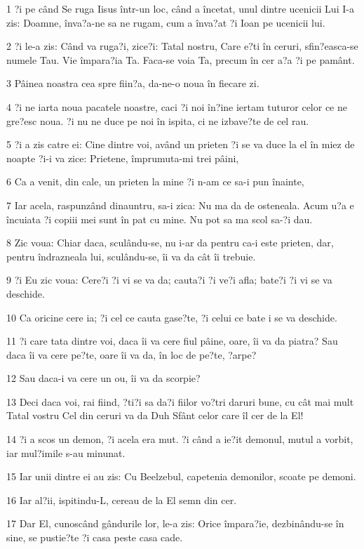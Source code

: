 \par 1 ?i pe când Se ruga Iisus într-un loc, când a încetat, unul dintre ucenicii Lui I-a zis: Doamne, înva?a-ne sa ne rugam, cum a înva?at ?i Ioan pe ucenicii lui.
\par 2 ?i le-a zis: Când va ruga?i, zice?i: Tatal nostru, Care e?ti în ceruri, sfin?easca-se numele Tau. Vie împara?ia Ta. Faca-se voia Ta, precum în cer a?a ?i pe pamânt.
\par 3 Pâinea noastra cea spre fiin?a, da-ne-o noua în fiecare zi.
\par 4 ?i ne iarta noua pacatele noastre, caci ?i noi în?ine iertam tuturor celor ce ne gre?esc noua. ?i nu ne duce pe noi în ispita, ci ne izbave?te de cel rau.
\par 5 ?i a zis catre ei: Cine dintre voi, având un prieten ?i se va duce la el în miez de noapte ?i-i va zice: Prietene, împrumuta-mi trei pâini,
\par 6 Ca a venit, din cale, un prieten la mine ?i n-am ce sa-i pun înainte,
\par 7 Iar acela, raspunzând dinauntru, sa-i zica: Nu ma da de osteneala. Acum u?a e încuiata ?i copiii mei sunt în pat cu mine. Nu pot sa ma scol sa-?i dau.
\par 8 Zic voua: Chiar daca, sculându-se, nu i-ar da pentru ca-i este prieten, dar, pentru îndrazneala lui, sculându-se, îi va da cât îi trebuie.
\par 9 ?i Eu zic voua: Cere?i ?i vi se va da; cauta?i ?i ve?i afla; bate?i ?i vi se va deschide.
\par 10 Ca oricine cere ia; ?i cel ce cauta gase?te, ?i celui ce bate i se va deschide.
\par 11 ?i care tata dintre voi, daca îi va cere fiul pâine, oare, îi va da piatra? Sau daca îi va cere pe?te, oare îi va da, în loc de pe?te, ?arpe?
\par 12 Sau daca-i va cere un ou, îi va da scorpie?
\par 13 Deci daca voi, rai fiind, ?ti?i sa da?i fiilor vo?tri daruri bune, cu cât mai mult Tatal vostru Cel din ceruri va da Duh Sfânt celor care îl cer de la El!
\par 14 ?i a scos un demon, ?i acela era mut. ?i când a ie?it demonul, mutul a vorbit, iar mul?imile s-au minunat.
\par 15 Iar unii dintre ei au zis: Cu Beelzebul, capetenia demonilor, scoate pe demoni.
\par 16 Iar al?ii, ispitindu-L, cereau de la El semn din cer.
\par 17 Dar El, cunoscând gândurile lor, le-a zis: Orice împara?ie, dezbinându-se în sine, se pustie?te ?i casa peste casa cade.
